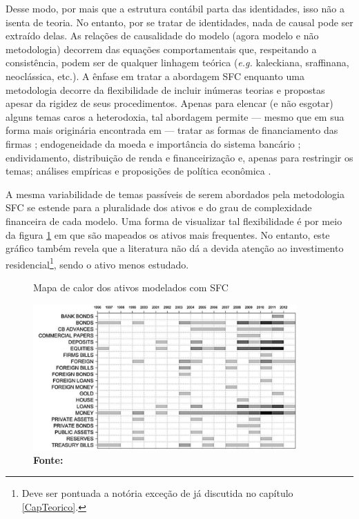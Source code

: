 Desse modo, por mais que a estrutura contábil parta das identidades, isso não a isenta de teoria. No entanto, por se tratar de identidades, nada de causal pode ser extraído delas. As relações de causalidade do modelo (agora modelo e não metodologia) decorrem das equações comportamentais que, respeitando a consistência, podem ser de qualquer linhagem teórica (\textit{e.g.} kaleckiana, sraffinana, neoclássica, etc.). A ênfase em tratar a abordagem SFC enquanto uma metodologia decorre da flexibilidade de incluir inúmeras teorias e propostas apesar da rigidez de seus procedimentos. Apenas para elencar (e não esgotar) alguns temas caros a heterodoxia, tal abordagem permite --- mesmo que em sua forma mais originária encontrada em \textcite{godley_macroeconomics_1983} --- tratar as formas de financiamento das firmas \cites{asimakopulos_kalecki_1983}{skott_finance_1988}{messori_financing_1991}; endogeneidade da moeda e importância do sistema bancário \cites{messori_financing_1991}{dow_horizontalism:_1996}{arestis_theoretical_1996}{godley_money_1999}{lavoie_note_1999}{lima_macrodynamics_2007}; endividamento, distribuição de renda e financeirização \cites{palley_inside_1996}{wolfson_irving_1996}{palley_money_1997}{palley_financial_2002}{dos_santos_revisiting_2009}{palley_inside_2010}{hein_finance-dominated_2012} e, apenas para restringir os temas; análises empíricas e proposições de política econômica \cites{godley_seven_1999}{godley_fiscal_2007}{godley_simple_2007}{arestis_income_2011}. 

A mesma variabilidade de temas passíveis de serem abordados pela metodologia SFC se estende para a pluralidade dos ativos e do grau de complexidade financeira de cada modelo. Uma forma de visualizar tal flexibilidade é por meio da figura \ref{Heatmap} em que são mapeados os ativos mais frequentes. No entanto, este gráfico também revela que a literatura não dá a devida atenção ao investimento residencial\footnote{Deve ser pontuada a notória exceção de \textcite{zezza_u.s._2008} já discutida no capítulo \ref{CapTeorico}.}, sendo o ativo menos estudado. 
\begin{figure}
    \centering
    \caption{Mapa de calor dos ativos modelados com SFC}
    \label{Heatmap}
    \includegraphics[width = 0.9\textwidth]{Modelo/Caverzassi_Heatmap.png}
    \caption*{\textbf{Fonte:} \textcite[p.~4]{caverzasi_stock-flow_2013}}
\end{figure}


